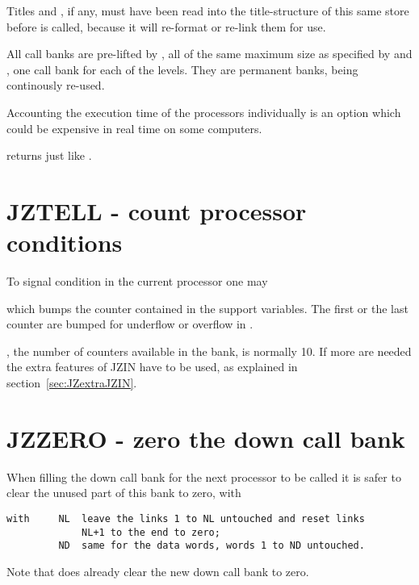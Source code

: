Titles  and , if any, must have been read into the
title-structure of this same store before  is called,
because it will re-format or re-link them for use.

All call banks are pre-lifted by ,
all of the same maximum size as specified by  and ,
one call bank for each of the  levels.
They are permanent banks,
being continously re-used.

Accounting the execution time of the processors individually
is an option which could be expensive in real time
on some computers.

 returns  just like .

\newpage
{}
\section{JZTELL - count processor conditions}

To signal condition  in the current processor one may


which bumps the counter  contained
in the support variables.
The first or the last counter are bumped for
underflow or overflow in .

, the number of counters available in the  bank,
is normally 10.
If more are needed the extra features of JZIN have
to be used,
as explained in section~\ref{sec:JZextraJZIN}.

\section{JZZERO - zero the down call bank}

When filling the down call bank for the next processor to be
called it is safer to clear the unused part of this bank to zero,
with


\begin{verbatim}
with     NL  leave the links 1 to NL untouched and reset links
             NL+1 to the end to zero;
         ND  same for the data words, words 1 to ND untouched.
\end{verbatim} 

Note that  does already clear the new down call bank to zero.

